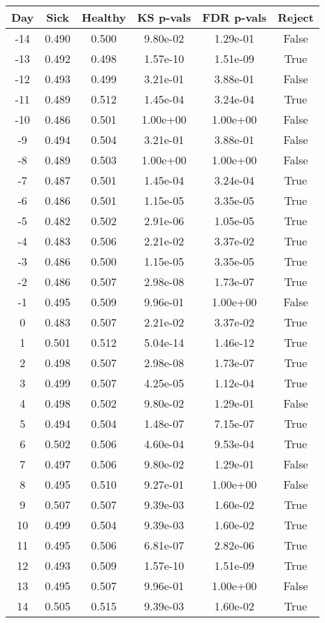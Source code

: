 \begin{tabular}{c|c|c|c|c|c}
Day &  Sick & Healthy &  KS p-vals & FDR p-vals & Reject\\
\hline
-14 & 0.490 &   0.500 &   9.80e-02 &   1.29e-01 &  False\\
-13 & 0.492 &   0.498 &   1.57e-10 &   1.51e-09 &   True\\
-12 & 0.493 &   0.499 &   3.21e-01 &   3.88e-01 &  False\\
-11 & 0.489 &   0.512 &   1.45e-04 &   3.24e-04 &   True\\
-10 & 0.486 &   0.501 &   1.00e+00 &   1.00e+00 &  False\\
 -9 & 0.494 &   0.504 &   3.21e-01 &   3.88e-01 &  False\\
 -8 & 0.489 &   0.503 &   1.00e+00 &   1.00e+00 &  False\\
 -7 & 0.487 &   0.501 &   1.45e-04 &   3.24e-04 &   True\\
 -6 & 0.486 &   0.501 &   1.15e-05 &   3.35e-05 &   True\\
 -5 & 0.482 &   0.502 &   2.91e-06 &   1.05e-05 &   True\\
 -4 & 0.483 &   0.506 &   2.21e-02 &   3.37e-02 &   True\\
 -3 & 0.486 &   0.500 &   1.15e-05 &   3.35e-05 &   True\\
 -2 & 0.486 &   0.507 &   2.98e-08 &   1.73e-07 &   True\\
 -1 & 0.495 &   0.509 &   9.96e-01 &   1.00e+00 &  False\\
  0 & 0.483 &   0.507 &   2.21e-02 &   3.37e-02 &   True\\
  1 & 0.501 &   0.512 &   5.04e-14 &   1.46e-12 &   True\\
  2 & 0.498 &   0.507 &   2.98e-08 &   1.73e-07 &   True\\
  3 & 0.499 &   0.507 &   4.25e-05 &   1.12e-04 &   True\\
  4 & 0.498 &   0.502 &   9.80e-02 &   1.29e-01 &  False\\
  5 & 0.494 &   0.504 &   1.48e-07 &   7.15e-07 &   True\\
  6 & 0.502 &   0.506 &   4.60e-04 &   9.53e-04 &   True\\
  7 & 0.497 &   0.506 &   9.80e-02 &   1.29e-01 &  False\\
  8 & 0.495 &   0.510 &   9.27e-01 &   1.00e+00 &  False\\
  9 & 0.507 &   0.507 &   9.39e-03 &   1.60e-02 &   True\\
 10 & 0.499 &   0.504 &   9.39e-03 &   1.60e-02 &   True\\
 11 & 0.495 &   0.506 &   6.81e-07 &   2.82e-06 &   True\\
 12 & 0.493 &   0.509 &   1.57e-10 &   1.51e-09 &   True\\
 13 & 0.495 &   0.507 &   9.96e-01 &   1.00e+00 &  False\\
 14 & 0.505 &   0.515 &   9.39e-03 &   1.60e-02 &   True\\
\end{tabular}